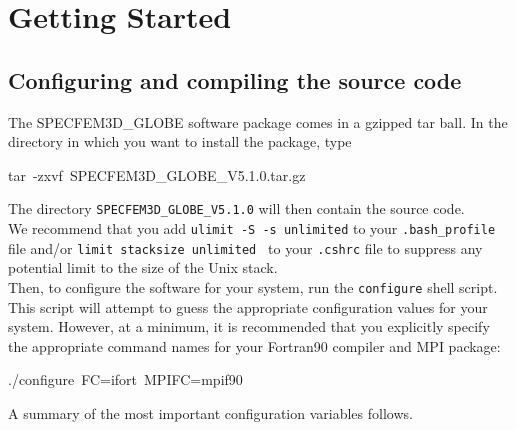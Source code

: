 \documentclass[oneside,english]{book}
\newenvironment{lyxcode}
{\begin{list}{}{
\setlength{\rightmargin}{\leftmargin}
\setlength{\listparindent}{0pt}%
\raggedright
\setlength{\itemsep}{0pt}
\setlength{\parsep}{0pt}
\normalfont\ttfamily}%
 \item[]}
{\end{list}}
\begin{document}
\chapter{\label{cha:Getting-Started}Getting Started}

\section{Configuring and compiling the source code}

The SPECFEM3D\_GLOBE software package comes in a gzipped tar ball.
In the directory in which you want to install the package, type

\begin{lyxcode}
tar~-zxvf~SPECFEM3D\_GLOBE\_V5.1.0.tar.gz
\end{lyxcode}
The directory \texttt{SPECFEM3D\_GLOBE\_V5.1.0} will then contain
the source code.\\

We recommend that you add {\texttt{ulimit -S -s unlimited}} to your {\texttt{.bash\_profile}} file and/or {\texttt{limit stacksize unlimited }} to your {\texttt{.cshrc}} file to suppress any potential limit to the size of the Unix stack.\\

Then, to configure the software for your system, run the \texttt{configure}
shell script. This script will attempt to guess the appropriate configuration
values for your system. However, at a minimum, it is recommended that
you explicitly specify the appropriate command names for your Fortran90
compiler and MPI package:

\begin{lyxcode}
./configure~FC=ifort~MPIFC=mpif90
\end{lyxcode}
A summary of the most important configuration variables follows.
\end{document}
